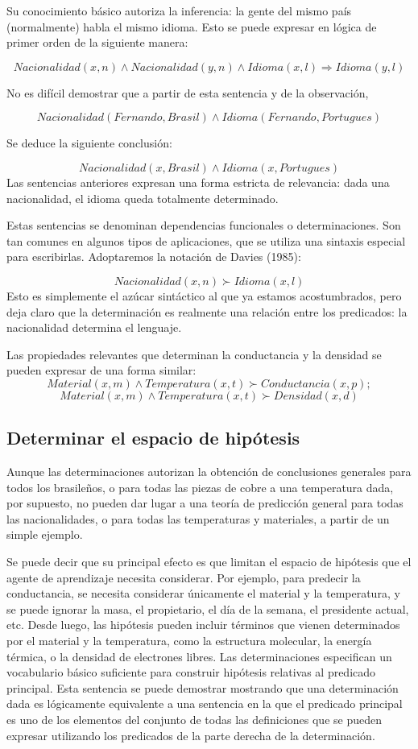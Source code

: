 \documentclass[12 pt, a4paper]{article}
\begin{document}
		Su conocimiento básico autoriza la inferencia: la gente del mismo país (normalmente) habla el mismo idioma. Esto se puede expresar en lógica de primer orden de la siguiente manera:
		
			$$Nacionalidad(x, n) \land Nacionalidad(y, n) \land Idioma(x, l) \Rightarrow Idioma(y, l)$$
		
		No es difícil demostrar que a partir de esta sentencia y de la observación, 
		
			$$Nacionalidad(Fernando, Brasil) \land Idioma(Fernando, Portugues)$$
		
		Se deduce la siguiente conclusión:
		
			$$Nacionalidad(x, Brasil) \land Idioma(x, Portugues)$$
		Las sentencias anteriores expresan una forma estricta de relevancia: dada una nacionalidad, el idioma queda totalmente determinado. 
		
		Estas sentencias se denominan dependencias funcionales o determinaciones. Son tan comunes en algunos tipos de aplicaciones, que se utiliza una sintaxis especial para escribirlas. Adoptaremos la notación de Davies (1985):
		
			$$Nacionalidad(x, n)\succ Idioma(x, l)$$
		Esto es simplemente el azúcar sintáctico al que ya estamos acostumbrados, pero deja claro que la determinación es realmente una relación entre los predicados: la nacionalidad determina el lenguaje. 

		Las propiedades relevantes que determinan la conductancia y la densidad se pueden expresar de una forma similar:
			$$Material(x, m)\land Temperatura(x, t) \succ Conductancia(x, p);$$
			$$Material(x, m) \land Temperatura(x, t) \succ Densidad(x, d)$$
		
		\subsection{Determinar el espacio de hipótesis}
			Aunque las determinaciones autorizan la obtención de conclusiones generales para todos los brasileños, o para todas las piezas de cobre a una temperatura dada, por supuesto, no pueden dar lugar a una teoría de predicción general para todas las nacionalidades, o para todas las temperaturas y materiales, a partir de un simple ejemplo. 
			
			Se puede decir que su principal efecto es que limitan el espacio de hipótesis que el agente de aprendizaje necesita considerar. Por ejemplo, para predecir la conductancia, se necesita considerar únicamente el material y la temperatura, y se puede ignorar la masa, el propietario, el día de la semana, el presidente actual, etc. Desde luego, las hipótesis pueden incluir términos que vienen determinados por el material y la temperatura, como la estructura molecular, la energía térmica, o la densidad de electrones libres. Las determinaciones especifican un vocabulario básico suficiente para construir hipótesis relativas al predicado principal. Esta sentencia se puede demostrar mostrando que una determinación dada es lógicamente equivalente a una sentencia en la que el predicado principal es uno de los elementos del conjunto de todas las definiciones que se pueden expresar utilizando los predicados de la parte derecha de la determinación.
			
\end{document}
